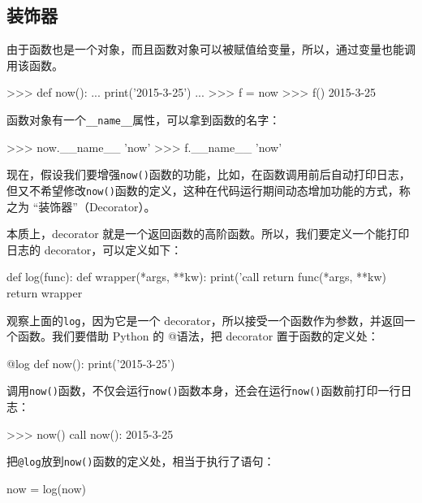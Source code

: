 \hypertarget{ux88c5ux9970ux5668}{%
\subsection{装饰器}\label{ux88c5ux9970ux5668}}

由于函数也是一个对象，而且函数对象可以被赋值给变量，所以，通过变量也能调用该函数。

\begin{pythoncode}
>>> def now():
...     print('2015-3-25')
...
>>> f = now
>>> f()
2015-3-25
\end{pythoncode}

函数对象有一个\texttt{\_\_name\_\_}属性，可以拿到函数的名字：

\begin{pythoncode}
>>> now.__name__
'now'
>>> f.__name__
'now'
\end{pythoncode}

现在，假设我们要增强\texttt{now()}函数的功能，比如，在函数调用前后自动打印日志，但又不希望修改\texttt{now()}函数的定义，这种在代码运行期间动态增加功能的方式，称之为
``装饰器''（Decorator）。

本质上，decorator
就是一个返回函数的高阶函数。所以，我们要定义一个能打印日志的
decorator，可以定义如下：

\begin{pythoncode}
def log(func):
    def wrapper(*args, **kw):
        print('call %
        return func(*args, **kw)
    return wrapper
\end{pythoncode}

观察上面的\texttt{log}，因为它是一个
decorator，所以接受一个函数作为参数，并返回一个函数。我们要借助 Python
的 @语法，把 decorator 置于函数的定义处：

\begin{pythoncode}
@log
def now():
    print('2015-3-25')
\end{pythoncode}

调用\texttt{now()}函数，不仅会运行\texttt{now()}函数本身，还会在运行\texttt{now()}函数前打印一行日志：

\begin{pythoncode}
>>> now()
call now():
2015-3-25
\end{pythoncode}

把\texttt{@log}放到\texttt{now()}函数的定义处，相当于执行了语句：

\begin{pythoncode}
now = log(now)
\end{pythoncode}

